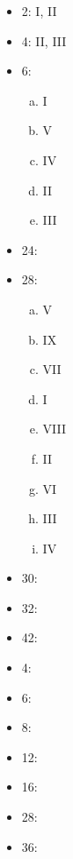 \documentclass[10pt]{extarticle}
\begin{document}
  \begin{problem}{12.2}
    \begin{itemize}
      \item 2: I, II
      \item 4: II, III
      \item 6:
        \begin{enumerate}[(a)]
          \item I
          \item V
          \item IV
          \item II
          \item III
        \end{enumerate}
      \item 24:
      \item 28:
        \begin{enumerate}[(a)]
          \item V
          \item IX
          \item VII
          \item I
          \item VIII
          \item II
          \item VI
          \item III
          \item IV
        \end{enumerate}
      \item 30:
      \item 32:
      \item 42:
    \end{itemize}
  \end{problem}
  \begin{problem}{12.3}
    \begin{itemize}
      \item 4: 
      \item 6:
      \item 8:
      \item 12:
      \item 16:
      \item 28:
      \item 36:
    \end{itemize}
  \end{problem}
\end{document}
